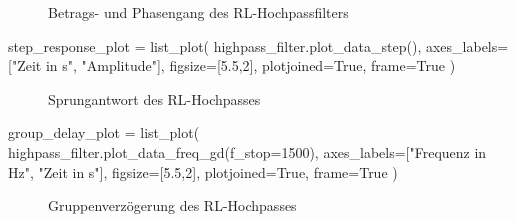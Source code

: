 \begin{figure}[H]
    \centering
    \begin{subfigure}{\textwidth}
        \centering
    \end{subfigure}
    \quad
    \begin{subfigure}{\textwidth}
        \centering
    \end{subfigure}
    \caption{Betrags- und Phasengang des RL-Hochpassfilters}
\end{figure}

\begin{sagesilent}
    step_response_plot = list_plot(
        highpass_filter.plot_data_step(),
        axes_labels=["Zeit in s", "Amplitude"],
        figsize=[5.5,2],
        plotjoined=True,
        frame=True
    )
\end{sagesilent}

\begin{figure}[H]
    \centering
    \caption{Sprungantwort des RL-Hochpasses}
\end{figure}

\begin{sagesilent}
    group_delay_plot = list_plot(
        highpass_filter.plot_data_freq_gd(f_stop=1500),
        axes_labels=["Frequenz in Hz", "Zeit in s"],
        figsize=[5.5,2],
        plotjoined=True,
        frame=True
    )
\end{sagesilent}

\begin{figure}[H]
    \centering
    \caption{Gruppenverzögerung des RL-Hochpasses}
\end{figure}
